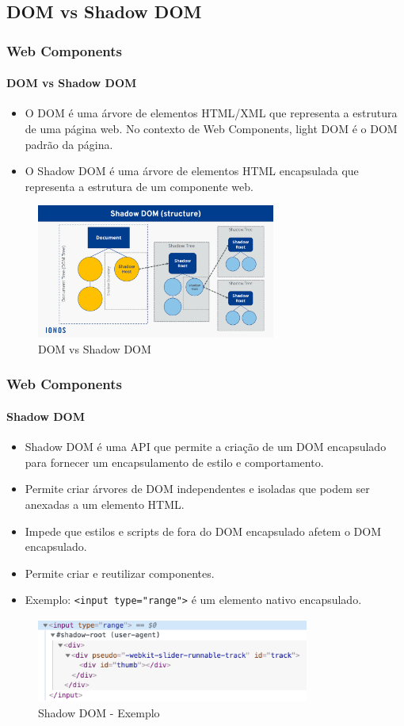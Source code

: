 \documentclass[
	9pt, %
	t, %
]{beamer}
\begin{document}
\subsection{DOM vs Shadow DOM}

\begin{frame}
	\frametitle{Web Components}
	\framesubtitle{DOM vs Shadow DOM}
	\begin{itemize}
		\item O DOM é uma árvore de elementos HTML/XML que representa a estrutura de uma página web. No contexto de Web Components, light DOM é o DOM padrão da página.
		\item O Shadow DOM é uma árvore de elementos HTML encapsulada que representa a estrutura de um componente web.
	\end{itemize}

	\begin{figure}
		\centering
		\includegraphics[width=0.7\textwidth]{dom_shadow_dom.png}
		\caption{DOM vs Shadow DOM}
	\end{figure}

\end{frame}

\begin{frame}
	\frametitle{Web Components}
	\framesubtitle{Shadow DOM}
	\begin{itemize}
		\item Shadow DOM é uma API que permite a criação de um DOM encapsulado para fornecer um encapsulamento de estilo e comportamento.
		\item Permite criar árvores de DOM independentes e isoladas que podem ser anexadas a um elemento HTML.
		\item Impede que estilos e scripts de fora do DOM encapsulado afetem o DOM encapsulado.
		\item Permite criar e reutilizar componentes.
		\item Exemplo: \texttt{<input type="range">} é um elemento nativo encapsulado.
	\end{itemize}

	\begin{figure}
		\centering
		\includegraphics[width=0.8\textwidth]{shadow_dom_example.png}
		\caption{Shadow DOM - Exemplo}
	\end{figure}

\end{frame}
\end{document}
